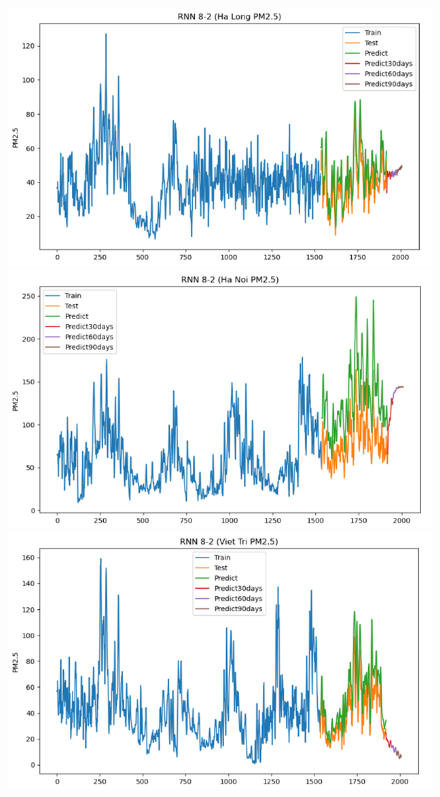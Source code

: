 \begin{figure}[H]
\begin{minipage}{0.15\textwidth}
        \end{minipage}
        \hfill

    \begin{minipage}{0.15\textwidth}
        \centering
        \includegraphics[width=1\textwidth]{img/final/RNN/90D/RNN_8_2_HL.png}
        \end{minipage}
        \hfill
        \begin{minipage}{0.15\textwidth}
        \centering
        \includegraphics[width=1\textwidth]{img/final/RNN/90D/RNN_8_2_HN.png}
        \end{minipage}
        \hfill
        \begin{minipage}{0.15\textwidth}
        \centering
        \includegraphics[width=1\textwidth]{img/final/RNN/90D/RNN_8_2_VT.png}
        \end{minipage}
        \hfill


\end{figure}
